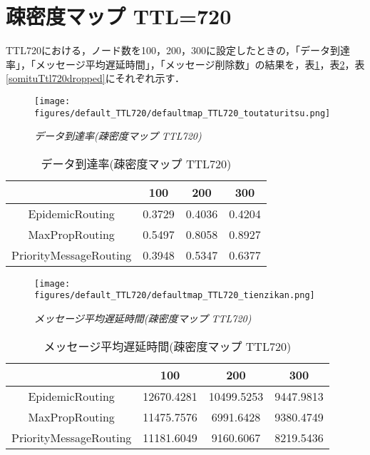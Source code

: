 \documentclass[11pt]{icsthesis}
\begin{document}
\newpage

\section{疎密度マップ TTL=720}
TTL720における，ノード数を100，200，300に設定したときの，「データ到達率」，「メッセージ平均遅延時間」，「メッセージ削除数」の結果を，表\ref{somituTtl720deliveryprob}，表\ref{somituTtl720latencyavg}，表\ref{somituTtl720dropped}にそれぞれ示す．

\begin{figure}[h]
\centering
\texttt{[image: figures/default\_TTL720/defaultmap\_TTL720\_toutaturitsu.png]}
\caption[]{\it{データ到達率(疎密度マップ TTL720)}}
\label{somituttl720deliveryprobgraph}
\end{figure}

\begin{table}[H]
 \begin{center}
      \caption[]{データ到達率(疎密度マップ TTL720)}
      \label{somituTtl720deliveryprob}
      \begin{tabular}{|c|c|c|c|}
\hline
&100&200&300\\
\hline
EpidemicRouting&0.3729&0.4036&0.4204\\
\hline
MaxPropRouting&0.5497&0.8058&0.8927\\
\hline
PriorityMessageRouting&0.3948&0.5347&0.6377\\
\hline
      \end{tabular}
    \end{center}
\end{table}

\newpage

\begin{figure}[h]
\centering
\texttt{[image: figures/default\_TTL720/defaultmap\_TTL720\_tienzikan.png]}
\caption[]{\it{メッセージ平均遅延時間(疎密度マップ TTL720)}}
\label{somituttl720latencyavggraph}
\end{figure}

\begin{table}[H]
 \begin{center}
      \caption[]{メッセージ平均遅延時間(疎密度マップ TTL720)}
      \label{somituTtl720latencyavg}
      \begin{tabular}{|c|c|c|c|}
\hline
&100&200&300\\
\hline
EpidemicRouting&12670.4281&10499.5253&9447.9813\\
\hline
MaxPropRouting&11475.7576&6991.6428&9380.4749\\
\hline
PriorityMessageRouting&11181.6049&9160.6067&8219.5436\\
\hline
      \end{tabular}
    \end{center}
\end{table}
\end{document}
